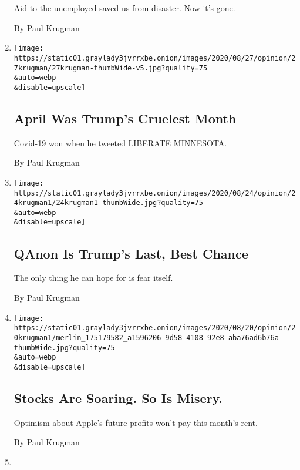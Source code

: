 \begin{enumerate}
  Aid to the unemployed saved us from disaster. Now it's gone.

  By Paul Krugman
\item
  \href{/2020/08/27/opinion/donald-trump-coronavirus.html}{}

  \texttt{[image: https://static01.graylady3jvrrxbe.onion/images/2020/08/27/opinion/27krugman/27krugman-thumbWide-v5.jpg?quality=75\\\&auto=webp\\\&disable=upscale]}

  \hypertarget{april-was-trumps-cruelest-month}{%
  \subsection{April Was Trump's Cruelest
  Month}\label{april-was-trumps-cruelest-month}}

  Covid-19 won when he tweeted LIBERATE MINNESOTA.

  By Paul Krugman
\item
  \href{/2020/08/24/opinion/trump-qanon-convention.html}{}

  \texttt{[image: https://static01.graylady3jvrrxbe.onion/images/2020/08/24/opinion/24krugman1/24krugman1-thumbWide.jpg?quality=75\\\&auto=webp\\\&disable=upscale]}

  \hypertarget{qanon-is-trumps-last-best-chance}{%
  \subsection{QAnon Is Trump's Last, Best
  Chance}\label{qanon-is-trumps-last-best-chance}}

  The only thing he can hope for is fear itself.

  By Paul Krugman
\item
  \href{/2020/08/20/opinion/stock-market-unemployment.html}{}

  \texttt{[image: https://static01.graylady3jvrrxbe.onion/images/2020/08/20/opinion/20krugman1/merlin\_175179582\_a1596206-9d58-4108-92e8-aba76ad6b76a-thumbWide.jpg?quality=75\\\&auto=webp\\\&disable=upscale]}

  \hypertarget{stocks-are-soaring-so-is-misery}{%
  \subsection{Stocks Are Soaring. So Is
  Misery.}\label{stocks-are-soaring-so-is-misery}}

  Optimism about Apple's future profits won't pay this month's rent.

  By Paul Krugman
\item
  \href{/2020/08/17/opinion/trump-us-mail.html}{}


\end{enumerate}
